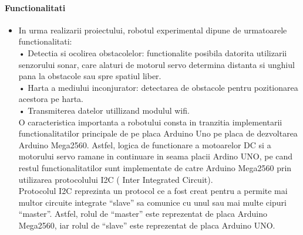 \paragraph{\bf{Functionalitati}}
\begin{itemize}
\item
	\tab In urma realizarii proiectului, robotul experimental dipune de urmatoarele functionalitati:\\
•	Detectia si ocolirea obstacolelor: functionalite posibila datorita utilizarii senzorului sonar, care alaturi de motorul servo determina distanta si unghiul pana la obstacole sau spre spatiul liber.\\
•	Harta a mediului inconjurator:  detectarea de obstacole pentru pozitionarea acestora pe harta.\\
•	Transmiterea datelor utillizand modulul wifi.\\

	\tab O caracteristica importanta a robotului consta in tranzitia implementarii functionalitatilor principale de pe placa Arduino Uno pe placa de dezvoltarea Arduino Mega2560. Astfel, logica de functionare a motoarelor DC si a motorului servo ramane in continuare in seama placii Ardino UNO, pe cand restul functionalitatilor sunt implementate de catre Arduino Mega2560 prin utilizarea protocolului I2C ( Inter Integrated Circuit). \\
	\tab Protocolul I2C reprezinta un protocol ce a fost creat pentru a permite mai multor circuite integrate “slave” sa comunice cu unul sau mai multe cipuri “master”.  Astfel, rolul de “master” este reprezentat de placa  Arduino Mega2560, iar rolul de “slave” este reprezentat de placa Arduino UNO.\\

\end{itemize}
